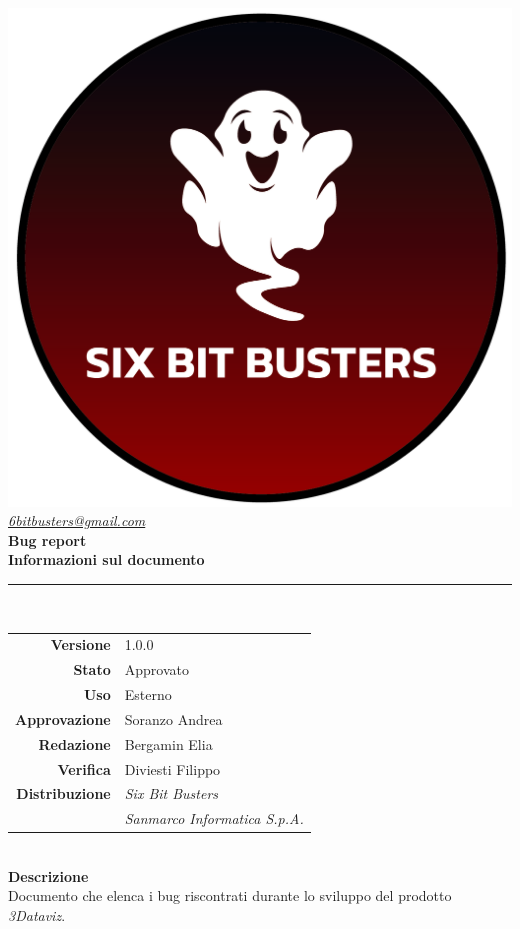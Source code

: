\thispagestyle{empty}
\renewcommand{\arraystretch}{1.3}


\begin{titlepage}
	\begin{center}
		
	\includegraphics[scale = 0.6]{template/images/logo-circle.png}
	\\[0.8cm]
	\href{mailto:6bitbusters@gmail.com}		      	
	{\large{\textit{6bitbusters@gmail.com} } }\\[0.8cm]
	
	\Huge \textbf{Bug report} \\[0.5cm]

	\large \textbf{Informazioni sul documento} \\
	\rule{0.6\textwidth}{0.4pt}
	\\[0.5cm]
	\begin{tabular}{r|l}
		\textbf{Versione} & 1.0.0\\
		\textbf{Stato} & Approvato\\
		\textbf{Uso} & Esterno\\                         
		\textbf{Approvazione} & Soranzo Andrea\\                      
		\textbf{Redazione} & Bergamin Elia\\
		\textbf{Verifica} & Diviesti Filippo\\                     
		\textbf{Distribuzione} & \textit{Six Bit Busters} \\ & \textit{Sanmarco Informatica S.p.A.}
	\end{tabular}	
	\\[0.8cm]

	\large \textbf{Descrizione} \\ Documento che elenca i bug riscontrati durante lo sviluppo del prodotto \textit{3Dataviz}.
	
	\end{center}
\end{titlepage}
